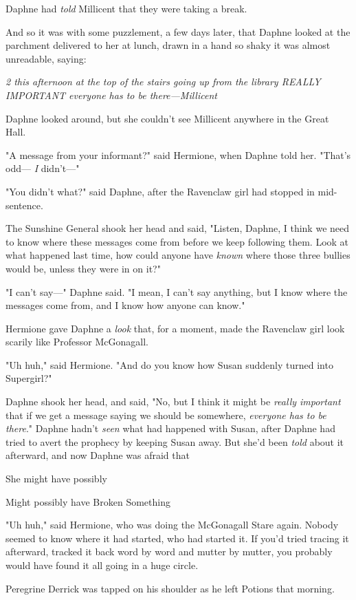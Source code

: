 Daphne had \emph{told} Millicent that they were taking a break.

And so it was with some puzzlement, a few days later, that Daphne looked at the
parchment delivered to her at lunch, drawn in a hand so shaky it was almost
unreadable, saying:

\emph{2 this afternoon at the top of the stairs going up from the library
REALLY IMPORTANT everyone has to be there—Millicent}

Daphne looked around, but she couldn't see Millicent anywhere in the Great Hall.

"A message from your informant?" said Hermione, when Daphne told her. "That's
odd— \emph{I} didn't—"

"You didn't what?" said Daphne, after the Ravenclaw girl had stopped in
mid-sentence.

The Sunshine General shook her head and said, "Listen, Daphne, I think we need
to know where these messages come from before we keep following them. Look at
what happened last time, how could anyone have \emph{known} where those three
bullies would be, unless they were in on it?"

"I can't say—" Daphne said. "I mean, I can't say anything, but I know where
the messages come from, and I know how anyone can know."

Hermione gave Daphne a \emph{look} that, for a moment, made the Ravenclaw girl
look scarily like Professor McGonagall.

"Uh huh," said Hermione. "And do you know how Susan suddenly turned into
Supergirl?"

Daphne shook her head, and said, "No, but I think it might be \emph{really
important} that if we get a message saying we should be somewhere,
\emph{everyone has to be there}." Daphne hadn't \emph{seen} what had happened
with Susan, after Daphne had tried to avert the prophecy by keeping Susan away.
But she'd been \emph{told} about it afterward, and now Daphne was afraid
that{\el}

She might have possibly{\el}

Might possibly have Broken Something{\el}

"Uh huh," said Hermione, who was doing the McGonagall Stare again.
\sbreak
Nobody seemed to know where it had started, who had started it. If you'd tried
tracing it afterward, tracked it back word by word and mutter by mutter, you
probably would have found it all going in a huge circle.

Peregrine Derrick was tapped on his shoulder as he left Potions that morning.

